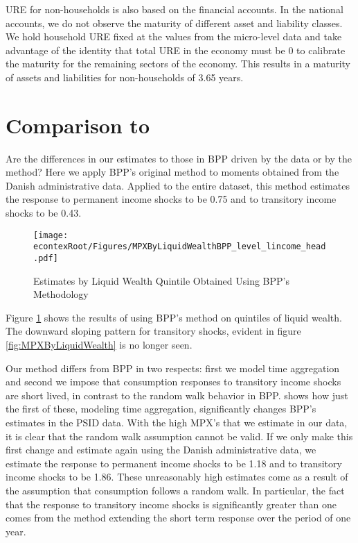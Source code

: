 \documentclass[titlepage]{\econtex}\newcommand{\texname}{ConsumptionHeterogeneity}
\begin{document}
	URE for non-households is also based on the financial accounts. In the national accounts, we do not observe the maturity of different asset and liability classes. We hold household URE fixed at the values from the micro-level data and take advantage of the identity that total URE in the economy must be 0 to calibrate the maturity for the remaining sectors of the economy. This results in a maturity of assets and liabilities for non-households of 3.65 years.
	
	\section{Comparison to \cite{blundell_consumption_2008}} \label{BPP_compare}
	Are the differences in our estimates to those in BPP driven by the data or by the method? Here we apply BPP's original method to moments obtained from the Danish administrative data. Applied to the entire dataset, this method estimates the response to permanent income shocks to be 0.75 and to transitory income shocks to be 0.43. 
	
	\begin{figure} 
		\begin{centering}
			\texttt{[image: \\econtexRoot/Figures/MPXByLiquidWealthBPP\_level\_lincome\_head.pdf]}
			\caption{Estimates by Liquid Wealth Quintile Obtained Using BPP's Methodology}
			\label{fig:BPP_liquid}
		\end{centering}
	\end{figure}
	
	Figure \ref{fig:BPP_liquid} shows the results of using BPP's method on quintiles of liquid wealth. The downward sloping pattern for transitory shocks, evident in figure \ref{fig:MPXByLiquidWealth} is no longer seen.
	
	Our method differs from BPP in two respects: first we model time aggregation and second we impose that consumption responses to transitory income shocks are short lived, in contrast to the random walk behavior in BPP. \cite{crawley_time_2020} shows how just the first of these, modeling time aggregation, significantly changes BPP's estimates in the PSID data. With the high MPX's that we estimate in our data, it is clear that the random walk assumption cannot be valid. If we only make this first change and estimate again using the Danish administrative data, we estimate the response to permanent income shocks to be 1.18 and to transitory income shocks to be 1.86. These unreasonably high estimates come as a result of the assumption that consumption follows a random walk. In particular, the fact that the response to transitory income shocks is significantly greater than one comes from the method extending the short term response over the period of one year.
	
\end{document}
